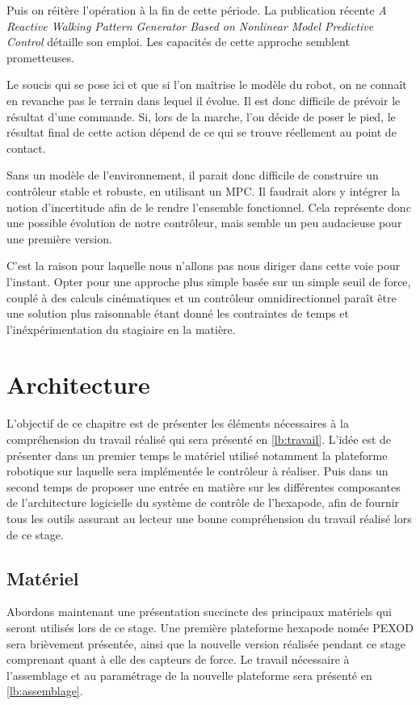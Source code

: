 \documentclass{tnreport}
\begin{document}
Puis on réitère l'opération à la fin de cette période. La publication récente \textit{A Reactive Walking Pattern Generator Based on Nonlinear Model Predictive Control} \cite{naveau_reactive_2016} détaille son emploi. Les capacités de cette approche semblent prometteuses. 

Le soucis qui se pose ici et que si l'on maîtrise le modèle du robot, on ne connaît en revanche pas le terrain dans lequel il évolue. Il est donc difficile de prévoir le résultat d'une commande. Si, lors de la marche, l'on décide de poser le pied, le résultat final de cette action dépend de ce qui se trouve réellement au point de contact. 

Sans un modèle de l'environnement, il parait donc difficile de construire un contrôleur stable et robuste, en utilisant un \gls{MPC}. Il faudrait alors y intégrer la notion d'incertitude afin de le rendre l'ensemble fonctionnel. Cela représente donc une possible évolution de notre contrôleur, mais semble un peu audacieuse pour une première version. 

C'est la raison pour laquelle nous n'allons pas nous diriger dans cette voie pour l'instant. Opter pour une approche plus simple basée sur un simple seuil de force, couplé à des calculs cinématiques et un contrôleur omnidirectionnel paraît être une solution plus raisonnable étant donné les contraintes de temps et l'inéxpérimentation du stagiaire en la matière. 

\chapter{Architecture}

L'objectif de ce chapitre est de présenter les éléments nécessaires à la compréhension du travail réalisé qui sera présenté en \ref{lb:travail}. L'idée est de présenter dans un premier temps le matériel utilisé notamment la plateforme robotique sur laquelle sera implémentée le contrôleur à réaliser. Puis dans un second temps de proposer une entrée en matière sur les différentes composantes de l'architecture logicielle du système de contrôle de l'hexapode, afin de fournir tous les outils assurant au lecteur une bonne compréhension du travail réalisé lors de ce stage. 
\section{Matériel}

Abordons maintenant une présentation succincte des principaux matériels qui seront utilisés lors de ce stage. Une première plateforme hexapode nomée PEXOD sera brièvement présentée, ainsi que la nouvelle version réalisée pendant ce stage comprenant quant à elle des capteurs de force. Le travail nécessaire à l'assemblage et au paramétrage de la nouvelle plateforme sera présenté en \ref{lb:assemblage}.
\end{document}
